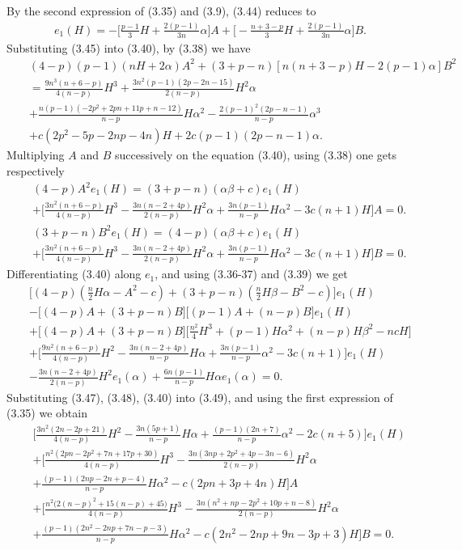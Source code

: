 \documentclass[twoside,reqno,A4]{amsart}
\theoremstyle{definition}
\theoremstyle{remark}
\numberwithin{equation}{section}
\begin{document}
By the second expression of (3.35) and (3.9), (3.44) reduces to
\begin{eqnarray}
e_1(H)=-\big[\frac{p-1}{3}H+\frac{2(p-1)}{3n}\alpha\big]A+\big[-\frac{n+3-p}{3}H+\frac{2(p-1)}{3n}\alpha\big]B.
\end{eqnarray}
Substituting (3.45) into (3.40), by (3.38) we have
\begin{eqnarray}
&&(4-p)(p-1)(nH+2\alpha)A^2+(3+p-n)[n(n+3-p)H-2(p-1)\alpha]B^2\nonumber\\
&&=\frac{9n^3(n+6-p)}{4(n-p)}H^3+\frac{3n^2(p-1)(2p-2n-15)}{2(n-p)}H^2\alpha\nonumber\\
&&+\frac{n(p-1)(-2p^2+2pn+11p+n-12)}{n-p}H\alpha^2-\frac{2(p-1)^2(2p-n-1)}{n-p}\alpha^3\nonumber\\
&&+c(2p^2-5p-2np-4n)H+2c(p-1)(2p-n-1)\alpha.
\end{eqnarray}
Multiplying $A$ and $B$ successively on the equation (3.40), using
(3.38) one gets respectively
\begin{eqnarray}
&&(4-p)A^2e_1(H)=(3+p-n)(\alpha\beta+c) e_1(H)\\
&&+\Big[\frac{3n^2(n+6-p)}{4(n-p)}H^3-\frac{3n(n-2+4p)}{2(n-p)}H^2\alpha+\frac{3n(p-1)}{n-p}H\alpha^2-3c(n+1)H\Big]A=0.\nonumber\\
&&(3+p-n)B^2e_1(H)=(4-p)(\alpha\beta+c) e_1(H)\\
&&+\Big[\frac{3n^2(n+6-p)}{4(n-p)}H^3-\frac{3n(n-2+4p)}{2(n-p)}H^2\alpha+\frac{3n(p-1)}{n-p}H\alpha^2-3c(n+1)H\Big]B=0.\nonumber
\end{eqnarray}
Differentiating (3.40) along $e_1$, and using (3.36-37) and (3.39)
we get
\begin{eqnarray}
&&\Big[(4-p)(\frac{n}{2}H\alpha-A^2-c)+(3+p-n)(\frac{n}{2}H\beta-B^2-c)\Big]e_1(H)\nonumber\\
&&-\Big[(4-p)A+(3+p-n)B\Big]\Big[(p-1)A+(n-p)B\Big]e_1(H)\nonumber\\
&&+\Big[(4-p)A+(3+p-n)B\Big]\Big[\frac{n^2}{4}H^3+(p-1)H\alpha^2+(n-p)H\beta^2-ncH\Big]\nonumber\\
&&+\Big[\frac{9n^2(n+6-p)}{4(n-p)}H^2-\frac{3n(n-2+4p)}{n-p}H\alpha+\frac{3n(p-1)}{n-p}\alpha^2-3c(n+1)\Big]e_1(H)\nonumber\\
&&-\frac{3n(n-2+4p)}{2(n-p)}H^2e_1(\alpha)+\frac{6n(p-1)}{n-p}H\alpha
e_1(\alpha)=0.
\end{eqnarray}
Substituting (3.47), (3.48), (3.40) into (3.49), and using the first
expression of (3.35) we obtain
\begin{eqnarray*}
&&\Big[\frac{3n^2(2n-2p+21)}{4(n-p)}H^2-\frac{3n(5p+1)}{n-p}H\alpha+\frac{(p-1)(2n+7)}{n-p}\alpha^2-2c(n+5)\Big]e_1(H)\nonumber\\
&&+\Big[\frac{n^2(2pn-2p^2+7n+17p+30)}{4(n-p)}H^3-\frac{3n(3np+2p^2+4p-3n-6)}{2(n-p)}H^2\alpha\nonumber\\
&&+\frac{(p-1)(2np-2n+p-4)}{n-p}H\alpha^2-c(2pn+3p+4n)H\Big]A\nonumber\\
&&+\Big[\frac{n^2\big(2(n-p)^2+15(n-p)+45\big)}{4(n-p)}H^3-\frac{3n(n^2+np-2p^2+10p+n-8)}{2(n-p)}H^2\alpha\nonumber\\
&&+\frac{(p-1)(2n^2-2np+7n-p-3)}{n-p}H\alpha^2-c(2n^2-2np+9n-3p+3)H\Big]B=0.
\end{eqnarray*}
\end{document}
